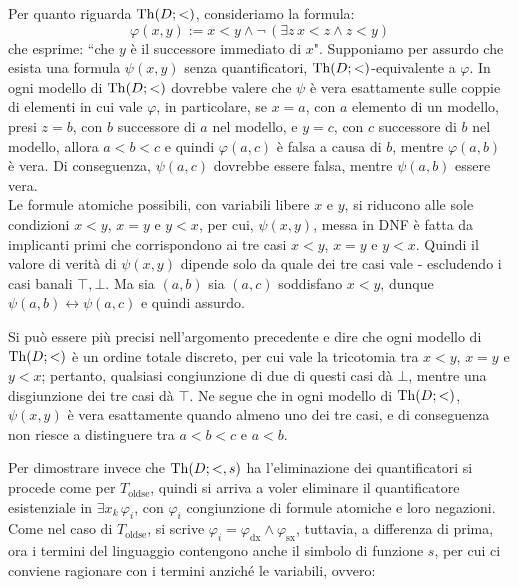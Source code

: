 \begin{soln}
    Per quanto riguarda $\operatorname{Th}(D;<)$, consideriamo la formula:
    \[\varphi(x,y) := x < y \land \neg\, ( \exists z \, x < z \land z < y )\]
    che esprime: ``che $y$ è il successore immediato di $x$".
    Supponiamo per assurdo che esista una formula $\psi(x,y)$ senza quantificatori, $\operatorname{Th}(D;<)$-equivalente a $\varphi$. In ogni 
    modello di $\operatorname{Th}(D;<)$ dovrebbe valere che $\psi$ è vera esattamente sulle coppie di elementi in cui vale $\varphi$, in particolare,
    se $x = a$, con $a$ elemento di un modello, presi $z = b$, con $b$ successore di $a$ nel modello, e $y = c$, con $c$ successore di $b$ nel modello, allora $a < b < c$ e quindi $\varphi(a,c)$ è falsa a causa di $b$, mentre $\varphi(a,b)$ è vera.
    Di conseguenza, $\psi(a,c)$ dovrebbe essere falsa, mentre $\psi(a,b)$ essere vera.\\
    Le formule atomiche possibili, con variabili libere $x$ e $y$, si riducono alle sole condizioni $x < y$, $x = y$ e $y < x$,
    per cui, $\psi(x,y)$, messa in DNF è fatta da implicanti primi che corrispondono ai tre casi $x < y$, $x = y$ e $y < x$.
    Quindi il valore di verità di $\psi(x,y)$ dipende solo da quale dei tre casi vale - escludendo i casi banali $\top,\bot$.
    Ma sia $(a,b)$ sia $(a,c)$ soddisfano $x < y$, dunque $\psi(a,b) \leftrightarrow \psi(a,c)$ e quindi assurdo.
    \begin{remark}
        Si può essere più precisi nell'argomento precedente e dire che ogni modello di $\operatorname{Th}(D;<)$ è un ordine totale discreto, per cui vale la tricotomia 
        tra $x < y$, $x = y$ e $y < x$; pertanto, qualsiasi congiunzione di due di questi casi dà $\bot$, mentre una disgiunzione dei tre casi dà $\top$.
        Ne segue che in ogni modello di $\operatorname{Th}(D;<)$, $\psi(x,y)$ è vera esattamente quando almeno uno dei tre casi, e di conseguenza non riesce a distinguere tra $a < b < c$ e $a < b$.
    \end{remark}
    Per dimostrare invece che $\operatorname{Th}(D;<,s)$ ha l'eliminazione dei quantificatori si procede come per $T_{\text{oldse}}$, quindi si arriva a voler eliminare il quantificatore esistenziale 
    in $\exists x_k \, \varphi_i$, con $\varphi_i$ congiunzione di formule atomiche e loro negazioni.\\
    Come nel caso di $T_{\text{oldse}}$, si scrive $\varphi_i = \varphi_{\text{dx}} \land \varphi_{\text{sx}}$, tuttavia, a differenza di prima, ora i termini del linguaggio contengono anche il simbolo di funzione $s$,
    per cui ci conviene ragionare con i termini anziché le variabili, ovvero:

\end{soln}
